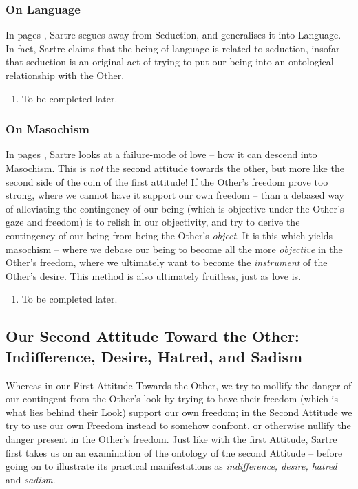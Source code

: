 \subsubsection{On Language}

In pages \autocite[493 -- 499]{sartre}, Sartre segues away from Seduction, and generalises it into Language. In fact, Sartre claims that the being of language is related to seduction, insofar that seduction is an original act of trying to put our being into an ontological relationship with the Other.

\begin{enumerate}
  \item To be completed later.
\end{enumerate}

\subsubsection{On Masochism}

In pages \autocite[499 -- 501]{sartre}, Sartre looks at a failure-mode of love -- how it can descend into Masochism. This is \emph{not} the second attitude towards the other, but more like the second side of the coin of the first attitude! If the Other's freedom prove too strong, where we cannot have it support our own freedom -- than a debased way of alleviating the contingency of our being (which is objective under the Other's gaze and freedom) is to relish in our objectivity, and try to derive the contingency of our being from being the Other's \emph{object}. It is this which yields masochism -- where we debase our being to become all the more \emph{objective} in the Other's freedom, where we ultimately want to become the \emph{instrument} of the Other's desire. This method is also ultimately fruitless, just as love is.

\begin{enumerate}
  \item To be completed later.
\end{enumerate}

\subsection{Our Second Attitude Toward the Other: \\ Indifference, Desire, Hatred, and Sadism}

Whereas in our First Attitude Towards the Other, we try to mollify the danger of our contingent from the Other's look by trying to have their freedom (which is what lies behind their Look) support our own freedom; in the Second Attitude we try to use our own Freedom instead to somehow confront, or otherwise nullify the danger present in the Other's freedom. Just like with the first Attitude, Sartre first takes us on an examination of the ontology of the second Attitude -- before going on to illustrate its practical manifestations as \emph{indifference, desire, hatred} and \emph{sadism}.

